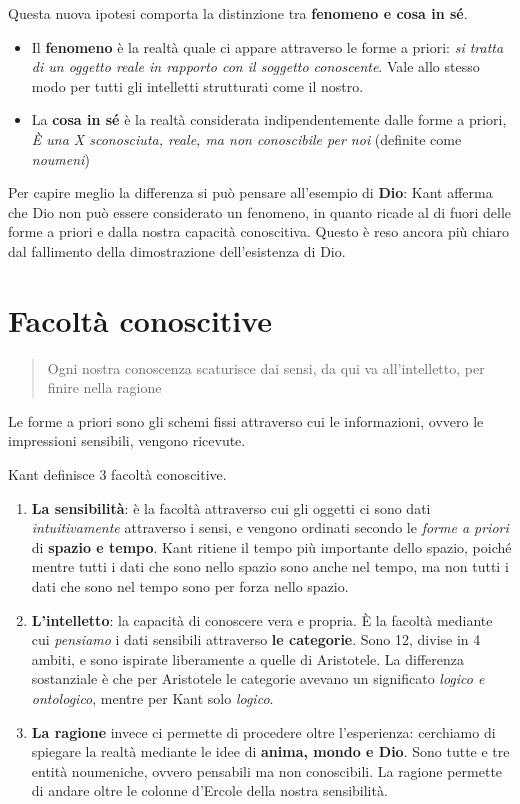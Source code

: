 \documentclass[a4paper, twoside, titlepage]{book}
\begin{document}
Questa nuova ipotesi comporta la distinzione tra \textbf{fenomeno e cosa in sé}.
\begin{itemize}
\item Il \textbf{fenomeno} è la realtà quale ci appare attraverso le forme a priori: \textit{si tratta di un oggetto reale in rapporto con il soggetto conoscente}. Vale allo stesso modo per tutti gli intelletti strutturati come il nostro.
\item La \textbf{cosa in sé} è la realtà considerata indipendentemente dalle forme a priori, \textit{È una X sconosciuta, reale, ma non conoscibile per noi} (definite come \textit{noumeni})
\end{itemize}

Per capire meglio la differenza si può pensare all’esempio di \textbf{Dio}: Kant afferma che Dio non può essere considerato un fenomeno, in quanto ricade al di fuori delle forme a priori e dalla nostra capacità conoscitiva.
Questo è reso ancora più chiaro dal fallimento della dimostrazione dell’esistenza di Dio.

\section{Facoltà conoscitive}

\begin{quotation}
Ogni nostra conoscenza scaturisce dai sensi, da qui va all’intelletto, per finire nella ragione
\end{quotation}

Le \textbf{}forme a priori\textbf{} sono gli schemi fissi attraverso cui le informazioni, ovvero le impressioni sensibili, vengono ricevute.

Kant definisce 3 facoltà conoscitive.
\begin{enumerate}
\item \textbf{La sensibilità}: è la facoltà attraverso cui gli oggetti ci sono dati \textit{intuitivamente} attraverso i sensi, e vengono ordinati secondo le \textit{forme a priori} di \textbf{spazio e tempo}. Kant ritiene il tempo più importante dello spazio, poiché mentre tutti i dati che sono nello spazio sono anche nel tempo, ma non tutti i dati che sono nel tempo sono per forza nello spazio.
\item \textbf{L’intelletto}: la capacità di conoscere vera e propria. È la facoltà mediante cui \textit{pensiamo} i dati sensibili attraverso \textbf{le categorie}. Sono 12, divise in 4 ambiti, e sono ispirate liberamente a quelle di Aristotele. La differenza sostanziale è che per Aristotele le categorie avevano un significato \textit{logico e ontologico}, mentre per Kant solo \textit{logico}.
\item \textbf{La ragione} invece ci permette di procedere oltre l’esperienza: cerchiamo di spiegare la realtà mediante le idee di \textbf{anima, mondo e Dio}. Sono tutte e tre entità noumeniche, ovvero pensabili ma non conoscibili. La ragione permette di andare oltre le colonne d’Ercole della nostra sensibilità.
\end{enumerate}
\end{document}
